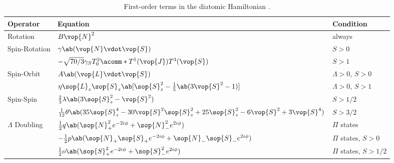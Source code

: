 \begin{table}[H]
    \centering
    \renewcommand{\arraystretch}{1.5}
    \caption{First-order terms in the diatomic Hamiltonian \cite[232-233]{westernPGOPHERProgramSimulating2017}.}
    \begin{tabular}{lll}
        \toprule
        \textbf{Operator} & \textbf{Equation}                                                                                         & \textbf{Condition}      \\
        \midrule
        Rotation          & $B\vop{N}^2$                                                                                              & always                  \\
        \cmidrule{2-3}
        \multirow{2}{*}{Spin-Rotation}
        & $\gamma\ab(\vop{N}\vdot\vop{S})$                                                                          & $S > 0$                 \\
        & $-\sqrt{70/3}\gamma_ST_0^2\acomm*{T^1(\vop{J})}{T^3(\vop{S})}$                                            & $S > 1$                 \\
        \cmidrule{2-3}
        \multirow{2}{*}{Spin-Orbit}
        & $A\ab(\vop{L}\vdot\vop{S})$                                                                               & $\Lambda > 0$, $S > 0$  \\
        & $\eta\sop{L}_z\sop{S}_z\ab[\sop{S}_z^2 - \frac{1}{5}\ab(3\vop{S}^2 - 1)]$                                 & $\Lambda > 0$, $S > 1$  \\
        \cmidrule{2-3}
        \multirow{2}{*}{Spin-Spin}
        & $\frac{2}{3}\lambda\ab(3\sop{S}_z^2 - \vop{S}^2)$                                                         & $S > 1/2$               \\
        & $\frac{1}{12}\theta\ab(35\sop{S}_z^4 - 30\vop{S}^2\sop{S}_z^2 + 25\sop{S}_z^2 - 6\vop{S}^2 + 3\vop{S}^4)$ & $S > 3/2$               \\
        \cmidrule{2-3}
        \multirow{3}{*}{$\Lambda$ Doubling}
        & $\frac{1}{2}q\ab(\sop{N}_+^2e^{-2i\phi} + \sop{N}_-^2e^{2i\phi})$                                         & $\Pi$ states            \\
        & $-\frac{1}{2}p\ab(\sop{N}_+\sop{S}_+e^{-2i\phi} + \sop{N}_-\sop{S}_-e^{2i\phi})$                          & $\Pi$ states, $S > 0$   \\
        & $\frac{1}{2}o\ab(\sop{S}_+^2e^{-2i\phi} + \sop{S}_-^2e^{2i\phi})$                                         & $\Pi$ states, $S > 1/2$ \\
        \bottomrule
    \end{tabular}
\end{table}

